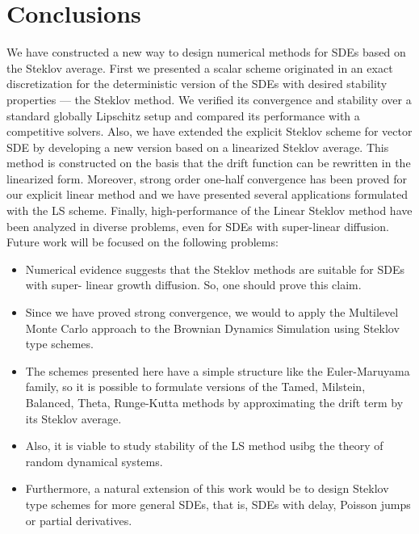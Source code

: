 \section{Conclusions}
	We have constructed a new way  to design numerical methods for SDEs based on the Steklov average.
First we presented a scalar scheme  originated in an exact discretization for the deterministic version of the SDEs 
with desired stability properties --- the Steklov method.
We verified its convergence and stability over a standard globally Lipschitz setup and compared its performance with a 
competitive solvers.
%
Also, we have extended the explicit Steklov scheme for vector SDE by developing a new version based on a linearized 
Steklov average. This method is constructed on the basis that the drift function can be rewritten in the linearized 
form. Moreover, strong order one-half convergence has been proved for our explicit linear method and we have presented 
several applications formulated with the LS scheme. Finally, high-performance of the Linear Steklov method have been 
analyzed in diverse problems, even for SDEs with super-linear diffusion.
Future work will be focused on the following problems:
%
\begin{itemize}
	\item
		Numerical evidence suggests that the Steklov methods are suitable for SDEs with super-	
		linear growth diffusion. 
		So, one should prove this claim.
	\item
		Since we have proved strong convergence, we would to apply the Multilevel Monte Carlo 
		approach to
		the Brownian Dynamics Simulation using Steklov type schemes.		
	\item
		The schemes presented here have a simple structure like the	Euler-Maruyama family, so it 
		is possible	to formulate versions of the Tamed, Milstein, Balanced, Theta, 
		Runge-Kutta methods by approximating the drift term by its Steklov average.  
	\item	
		Also, it is viable to study stability of the LS method usibg the theory of random 
		dynamical systems.
	\item
		Furthermore, a natural extension of this work would be to design Steklov type schemes 
		for more general SDEs, that is, SDEs with delay, Poisson jumps or partial derivatives. 	
\end{itemize}

 
 
